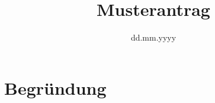 \documentclass{juso-antrag}
\title{Musterantrag}%
\date{dd.mm.yyyy}%
\begin{document}
    \maketitle
    \begin{linenumbers}

    \end{linenumbers}

    \section*{Begründung}
    \label{sec:begründung}

\end{document}

